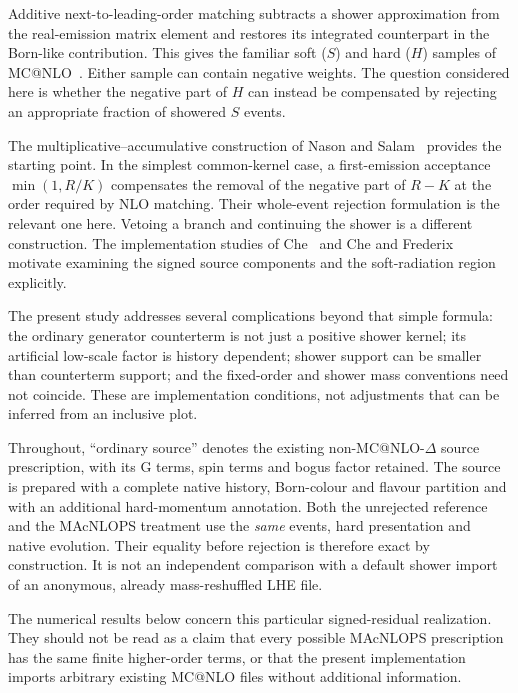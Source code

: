 \documentclass[11pt,a4paper]{article}
\makeatletter
\newcommand{\mcatnlo}{MC@NLO}
\newcommand{\macnlops}{MAcNLOPS}
\makeatother
\begin{document}
Additive next-to-leading-order matching subtracts a shower approximation
from the real-emission matrix element and restores its integrated
counterpart in the Born-like contribution. This gives the familiar soft
($S$) and hard ($H$) samples of \mcatnlo{}~\cite{FrixioneWebber}.
Either sample can contain negative weights. The question considered here
is whether the negative part of $H$ can instead be compensated by rejecting
an appropriate fraction of showered $S$ events.

The multiplicative--accumulative construction of Nason and
Salam~\cite{NasonSalam} provides the starting point. In the simplest common-kernel
case, a first-emission acceptance $\min(1,R/K)$ compensates the removal of
the negative part of $R-K$ at the order required by NLO matching. Their
whole-event rejection formulation is the relevant one here. Vetoing a
branch and continuing the shower is a different construction. The
implementation studies of Che~\cite{CheThesis} and Che and
Frederix~\cite{CheFrederix} motivate examining the signed source components
and the soft-radiation region explicitly.

The present study addresses several complications beyond that simple
formula: the ordinary generator counterterm is not just a positive shower
kernel; its artificial low-scale factor is history dependent; shower
support can be smaller than counterterm support; and the fixed-order and
shower mass conventions need not coincide. These are implementation
conditions, not adjustments that can be inferred from an inclusive plot.

Throughout, ``ordinary source'' denotes the existing non-\mcatnlo{}-$\Delta$
source prescription, with its G terms, spin terms and bogus factor
retained. The source is prepared with a complete native history,
Born-colour and flavour partition and with an additional hard-momentum
annotation. Both the unrejected reference and the \macnlops{} treatment use
the \emph{same} events, hard presentation and native evolution. Their
equality before rejection is therefore exact by construction. It is not
an independent comparison with a default shower import of an anonymous,
already mass-reshuffled LHE file.

The numerical results below concern this particular signed-residual
realization. They should not be read as a claim that every possible
\macnlops{} prescription has the same finite higher-order terms, or that
the present implementation imports arbitrary existing \mcatnlo{} files
without additional information.
\end{document}
